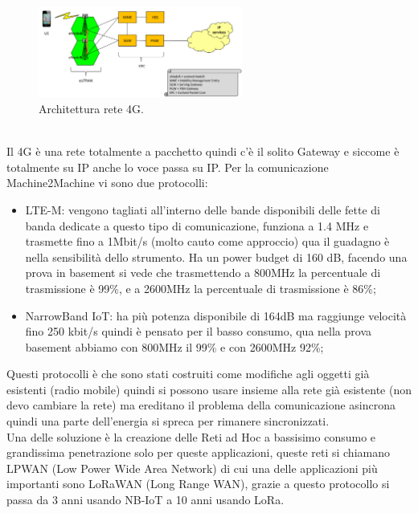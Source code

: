 \documentclass[11pt, twocolumn]{article}
\newenvironment{myitemize}
{ \begin{itemize}[topsep=0ex]
		\setlength{\itemsep}{0pt}
		\setlength{\parskip}{0pt}
		\setlength{\parsep}{0pt}     }
	{ \end{itemize}                  }
\begin{document}
\begin{figure}[!h]
  \centering
  \includegraphics[width=\linewidth,height=3cm]{imgs/4g.png}
  \caption{Architettura rete 4G.}
  \label{fig:4g}
\end{figure}\\
Il 4G è una rete totalmente a pacchetto quindi c'è il solito Gateway e siccome è totalmente su IP anche lo voce passa su IP.
Per la comunicazione Machine2Machine vi sono due protocolli:
\begin{myitemize}
  \item LTE-M: vengono tagliati all'interno delle bande disponibili delle fette di banda dedicate a questo tipo di comunicazione, funziona a 1.4 MHz e trasmette fino a 1Mbit/s (molto cauto come approccio) qua il guadagno è nella sensibilità dello strumento.
  Ha un power budget di 160 dB, facendo una prova in basement si vede che trasmettendo a 800MHz la percentuale di trasmissione è 99\%, e a 2600MHz la percentuale di trasmissione è 86\%;
  \item NarrowBand IoT: ha più potenza disponibile di 164dB ma raggiunge velocità fino 250 kbit/s quindi è pensato per il basso consumo, qua nella prova basement abbiamo con 800MHz il 99\% e con 2600MHz 92\%;
\end{myitemize}
Questi protocolli è che sono stati costruiti come modifiche agli oggetti già esistenti (radio mobile) quindi si possono usare insieme alla rete già esistente (non devo cambiare la rete) ma ereditano il problema della comunicazione asincrona quindi una parte dell'energia si spreca per rimanere sincronizzati.\\
Una delle soluzione è la creazione delle Reti ad Hoc a bassisimo consumo e grandissima penetrazione solo per queste applicazioni, queste reti si chiamano LPWAN (Low Power Wide Area Network) di cui una delle applicazioni più importanti sono LoRaWAN (Long Range WAN), grazie a questo protocollo si passa da 3 anni usando NB-IoT a 10 anni usando LoRa.
\end{document}
